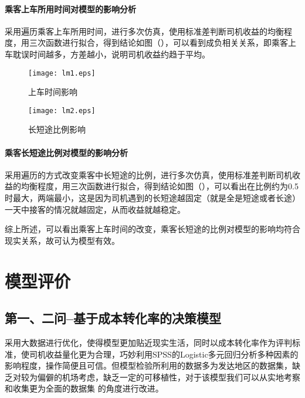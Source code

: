 \documentclass[withoutpreface,bwprint]{cumcmthesis} %
\begin{document}
\paragraph{乘客上车所用时间对模型的影响分析}


采用遍历乘客上车所用时间，进行多次仿真，使用标准差判断司机收益的均衡程度，用三次函数进行拟合，得到结论如图（），可以看到成负相关关系，即乘客上车耽误时间越多，方差越小，说明司机收益约趋于平均。


	\begin{figure}[htbp]
		\begin{minipage}[t]{0.45\linewidth}
			\centering
	\texttt{[image: lm1.eps]}
			\caption{上车时间影响}
		\end{minipage}%
		\begin{minipage}[t]{0.45\linewidth}
			\centering
	\texttt{[image: lm2.eps]}
			\caption{长短途比例影响}
		\end{minipage}
	\end{figure}

\paragraph{乘客长短途比例对模型的影响分析}



采用遍历的方式改变乘客中长短途的比例，进行多次仿真，使用标准差判断司机收益的均衡程度，用三次函数进行拟合，得到结论如图（），可以看出在比例约为0.5时最大，两端最小，这是因为司机遇到的长短途越固定（就是全是短途或者长途）一天中接客的情况就越固定，从而收益就越稳定。

综上所述，可以看出乘客上车时间的改变，乘客长短途的比例对模型的影响均符合现实关系，故可认为模型有效。


\section{模型评价}


\subsection{第一、二问--基于成本转化率的决策模型}
采用大数据进行优化，使得模型更加贴近现实生活，同时以成本转化率作为评判标准，使司机收益量化更为合理，巧妙利用SPSS的Logistic多元回归分析多种因素的影响程度，操作简便且可信。但模型检验所利用的数据多为发达地区的数据集，缺乏对较为偏僻的机场考虑，缺乏一定的可移植性，对于该模型我们可以从实地考察和收集更为全面的数据集
的角度进行改进。
\end{document}

